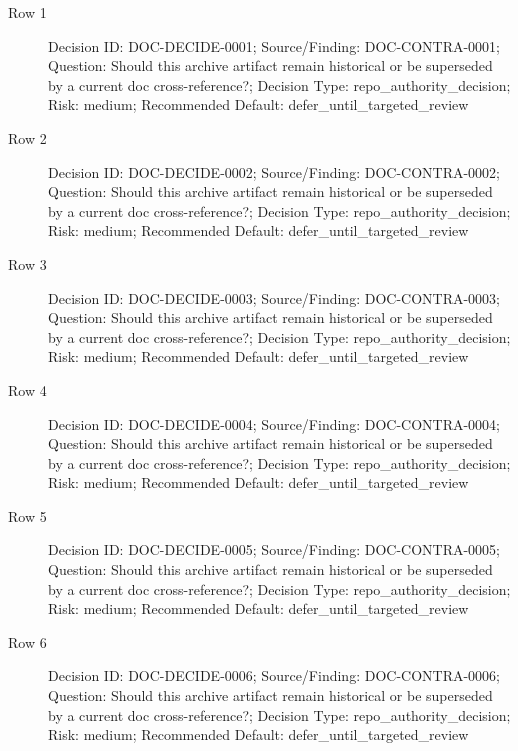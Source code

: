 \documentclass[10.5pt,a4paper,openany]{book}
\begin{document}
\begin{description}
\item[Row 1] Decision ID: DOC-\allowbreak{}DECIDE-\allowbreak{}0001; Source/\allowbreak{}Finding: DOC-\allowbreak{}CONTRA-\allowbreak{}0001; Question: Should this archive artifact remain historical or be superseded by a current doc cross-\allowbreak{}reference?; Decision Type: repo\_\allowbreak{}authority\_\allowbreak{}decision; Risk: medium; Recommended Default: defer\_\allowbreak{}until\_\allowbreak{}targeted\_\allowbreak{}review
\item[Row 2] Decision ID: DOC-\allowbreak{}DECIDE-\allowbreak{}0002; Source/\allowbreak{}Finding: DOC-\allowbreak{}CONTRA-\allowbreak{}0002; Question: Should this archive artifact remain historical or be superseded by a current doc cross-\allowbreak{}reference?; Decision Type: repo\_\allowbreak{}authority\_\allowbreak{}decision; Risk: medium; Recommended Default: defer\_\allowbreak{}until\_\allowbreak{}targeted\_\allowbreak{}review
\item[Row 3] Decision ID: DOC-\allowbreak{}DECIDE-\allowbreak{}0003; Source/\allowbreak{}Finding: DOC-\allowbreak{}CONTRA-\allowbreak{}0003; Question: Should this archive artifact remain historical or be superseded by a current doc cross-\allowbreak{}reference?; Decision Type: repo\_\allowbreak{}authority\_\allowbreak{}decision; Risk: medium; Recommended Default: defer\_\allowbreak{}until\_\allowbreak{}targeted\_\allowbreak{}review
\item[Row 4] Decision ID: DOC-\allowbreak{}DECIDE-\allowbreak{}0004; Source/\allowbreak{}Finding: DOC-\allowbreak{}CONTRA-\allowbreak{}0004; Question: Should this archive artifact remain historical or be superseded by a current doc cross-\allowbreak{}reference?; Decision Type: repo\_\allowbreak{}authority\_\allowbreak{}decision; Risk: medium; Recommended Default: defer\_\allowbreak{}until\_\allowbreak{}targeted\_\allowbreak{}review
\item[Row 5] Decision ID: DOC-\allowbreak{}DECIDE-\allowbreak{}0005; Source/\allowbreak{}Finding: DOC-\allowbreak{}CONTRA-\allowbreak{}0005; Question: Should this archive artifact remain historical or be superseded by a current doc cross-\allowbreak{}reference?; Decision Type: repo\_\allowbreak{}authority\_\allowbreak{}decision; Risk: medium; Recommended Default: defer\_\allowbreak{}until\_\allowbreak{}targeted\_\allowbreak{}review
\item[Row 6] Decision ID: DOC-\allowbreak{}DECIDE-\allowbreak{}0006; Source/\allowbreak{}Finding: DOC-\allowbreak{}CONTRA-\allowbreak{}0006; Question: Should this archive artifact remain historical or be superseded by a current doc cross-\allowbreak{}reference?; Decision Type: repo\_\allowbreak{}authority\_\allowbreak{}decision; Risk: medium; Recommended Default: defer\_\allowbreak{}until\_\allowbreak{}targeted\_\allowbreak{}review

\end{description}
\end{document}

